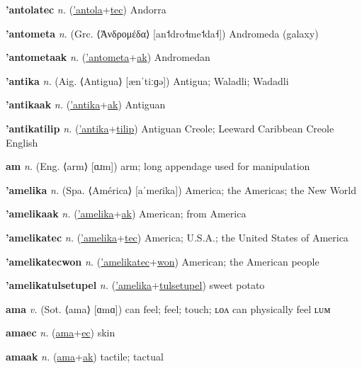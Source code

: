 \textbf{\hypertarget{'antolatec}{'antolatec}} \textit{n.} (\hyperlink{'antola}{'antola}+\allowbreak \hyperlink{tec}{tec})
Andorra

\textbf{\hypertarget{'antometa}{'antometa}} \textit{n.} (Grc. ⟨Ἀνδρομέδα⟩ [an˦dro˧me˦da˧])
Andromeda (galaxy)

\textbf{\hypertarget{'antometaak}{'antometaak}} \textit{n.} (\hyperlink{'antometa}{'antometa}+\allowbreak \hyperlink{ak}{ak})
Andromedan

\textbf{\hypertarget{'antika}{'antika}} \textit{n.} (Aig. ⟨Antigua⟩ [ænˈtiːɡə])
Antigua; Waladli; Wadadli

\textbf{\hypertarget{'antikaak}{'antikaak}} \textit{n.} (\hyperlink{'antika}{'antika}+\allowbreak \hyperlink{ak}{ak})
Antiguan

\textbf{\hypertarget{'antikatilip}{'antikatilip}} \textit{n.} (\hyperlink{'antika}{'antika}+\allowbreak \hyperlink{tilip}{tilip})
Antiguan Creole; Leeward Caribbean Creole English

\textbf{\hypertarget{am}{am}} \textit{n.} (Eng. ⟨arm⟩ [ɑɹm])
arm; long appendage used for manipulation

\textbf{\hypertarget{'amelika}{'amelika}} \textit{n.} (Spa. ⟨América⟩ [aˈmeɾika])
America; the Americas; the New World

\textbf{\hypertarget{'amelikaak}{'amelikaak}} \textit{n.} (\hyperlink{'amelika}{'amelika}+\allowbreak \hyperlink{ak}{ak})
American; from America

\textbf{\hypertarget{'amelikatec}{'amelikatec}} \textit{n.} (\hyperlink{'amelika}{'amelika}+\allowbreak \hyperlink{tec}{tec})
America; U.S.A.; the United States of America

\textbf{\hypertarget{'amelikatecwon}{'amelikatecwon}} \textit{n.} (\hyperlink{'amelikatec}{'amelikatec}+\allowbreak \hyperlink{won}{won})
American; the American people

\textbf{\hypertarget{'amelikatulsetupel}{'amelikatulsetupel}} \textit{n.} (\hyperlink{'amelika}{'amelika}+\allowbreak \hyperlink{tulsetupel}{tulsetupel})
sweet potato

\textbf{\hypertarget{ama}{ama}} \textit{v.} (Sot. ⟨ama⟩ [ɑmɑ])
can feel; feel; touch; ʟᴏᴧ can physically feel ʟᴜᴍ

\textbf{\hypertarget{amaec}{amaec}} \textit{n.} (\hyperlink{ama}{ama}+\allowbreak \hyperlink{ec}{ec})
skin

\textbf{\hypertarget{amaak}{amaak}} \textit{n.} (\hyperlink{ama}{ama}+\allowbreak \hyperlink{ak}{ak})
tactile; tactual

